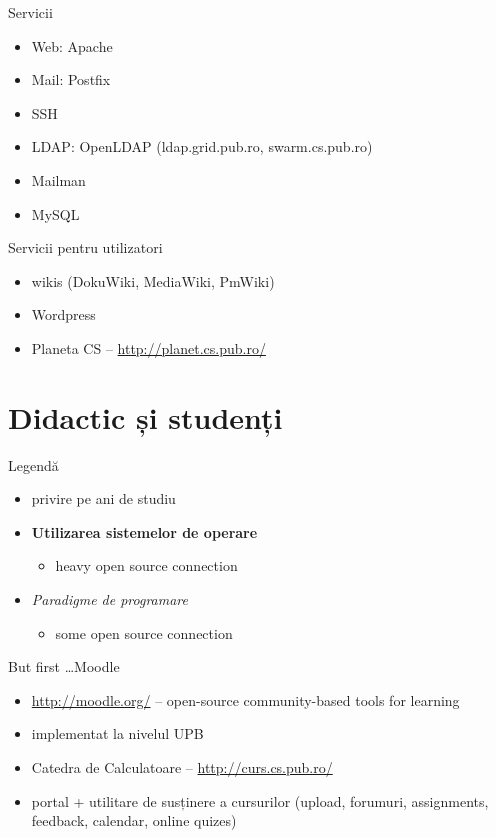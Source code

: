 \documentclass{simple}
\begin{document}
\begin{frame}{Servicii}
	\begin{itemize}
		\item Web: Apache
		\item Mail: Postfix
		\item SSH
		\item LDAP: OpenLDAP (ldap.grid.pub.ro, swarm.cs.pub.ro)
		\item Mailman
		\item MySQL
	\end{itemize}
\end{frame}

\begin{frame}{Servicii pentru utilizatori}
	\begin{itemize}
		\item wikis (DokuWiki, MediaWiki, PmWiki)
		\item Wordpress
		\item Planeta CS -- \url{http://planet.cs.pub.ro/}
	\end{itemize}
\end{frame}

\section{Didactic și studenți}

\frame{\tableofcontents[currentsection]}

\begin{frame}{Legendă}
	\begin{itemize}
		\item privire pe ani de studiu
		\item \textbf{Utilizarea sistemelor de operare}
			\begin{itemize}
				\item heavy open source connection
			\end{itemize}
		\item \textit{Paradigme de programare}
			\begin{itemize}
				\item some open source connection
			\end{itemize}
	\end{itemize}
\end{frame}

\begin{frame}{But first \ldots Moodle}
	\begin{itemize}
		\item \url{http://moodle.org/} -- open-source community-based tools
		for learning
		\item implementat la nivelul UPB
		\item Catedra de Calculatoare -- \url{http://curs.cs.pub.ro/}
		\item portal + utilitare de susținere a cursurilor (upload, forumuri,
		assignments, feedback, calendar, online quizes)
	\end{itemize}
\end{frame}
\end{document}
